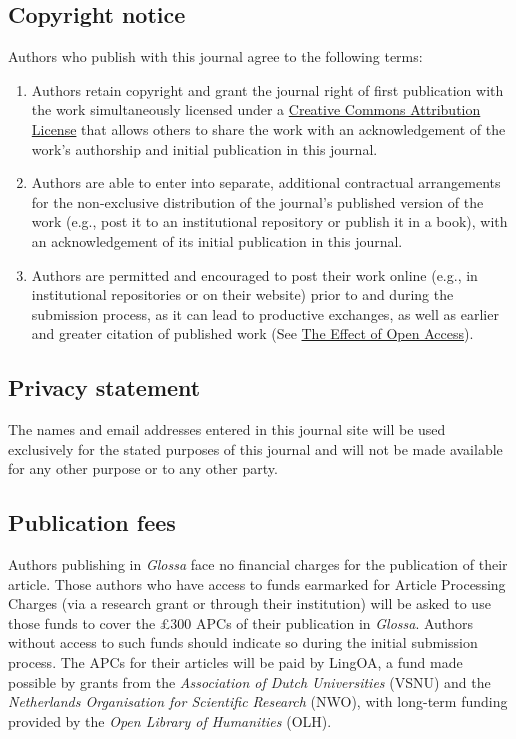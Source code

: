 \documentclass[charis,linguex]{glossa}
\begin{document}
\subsection{Copyright notice}

Authors who publish with this journal agree to the following terms:

\begin{enumerate}[label=\arabic*.]
\item Authors retain copyright and grant the journal right of first publication with the work simultaneously licensed under a \href{http://creativecommons.org/licenses/by/3.0/}{Creative Commons Attribution License} that allows others to share the work with an acknowledgement of the work's authorship and initial publication in this journal.
\item Authors are able to enter into separate, additional contractual arrangements for the non-exclusive distribution of the journal's published version of the work (e.g., post it to an institutional repository or publish it in a book), with an acknowledgement of its initial publication in this journal.
\item Authors are permitted and encouraged to post their work online (e.g., in institutional repositories or on their website) prior to and during the submission process, as it can lead to productive exchanges, as well as earlier and greater citation of published work (See \href{http://opcit.eprints.org/oacitation-biblio.html}{The Effect of Open Access}).
\end{enumerate}

\subsection{Privacy statement}

The names and email addresses entered in this journal site will be used exclusively for the stated purposes of this journal and will not be made available for any other purpose or to any other party.

\subsection{Publication fees}

Authors publishing in \textit{Glossa} face no financial charges for the publication of their article. Those authors who have access to funds earmarked for Article Processing Charges  (via a research grant or through their institution) will be asked to use those funds to cover the £300 APCs of their publication in \textit{Glossa}. Authors without access to such funds should indicate so during the initial submission process. The APCs for their articles will be paid by LingOA, a fund made possible by grants from the \textit{Association of Dutch Universities} (VSNU) and the \textit{Netherlands Organisation for Scientific Research} (NWO), with long-term funding provided by the \textit{Open Library of Humanities} (OLH).
\end{document}
